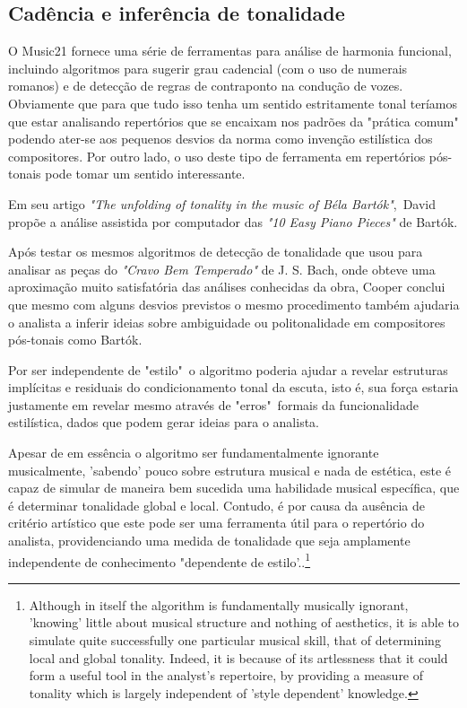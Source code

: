 \documentclass[
	12pt,				%
	openright,			%
	twoside,			%
	a4paper,			%
	english,			%
	french,				%
	spanish,			%
	brazil				%
	]{abntex2}
\begin{document}
\subsection{Cadência e inferência de tonalidade}


O Music21 fornece uma série de ferramentas para análise de harmonia funcional, incluindo algoritmos para sugerir grau cadencial (com o uso de numerais romanos) e de detecção de regras de contraponto na condução de vozes. Obviamente que para que tudo isso tenha um sentido estritamente tonal teríamos que estar analisando repertórios que se encaixam nos padrões da "prática comum"\cite[p. 354]{temperley2001cognition} podendo ater-se aos pequenos desvios da norma como invenção estilística dos compositores. Por outro lado, o uso deste tipo de ferramenta em repertórios pós-tonais pode tomar um sentido interessante. 

Em seu artigo \textit{"The unfolding of tonality in the music of Béla Bartók"},\ David  propõe a análise assistida por computador das \textit{"10 Easy Piano Pieces"} de Bartók. 

Após testar os mesmos algoritmos de detecção de tonalidade que usou para analisar as peças do \textit{"Cravo Bem Temperado"} de J. S. Bach, onde obteve uma aproximação muito satisfatória das análises conhecidas da obra, Cooper conclui que mesmo com alguns desvios previstos o mesmo procedimento também ajudaria o analista a inferir ideias sobre ambiguidade ou politonalidade em compositores pós-tonais como Bartók.

Por ser independente de "estilo"\ o algoritmo poderia ajudar a revelar estruturas implícitas e residuais do condicionamento tonal da escuta, isto é, sua força estaria justamente em revelar mesmo através de "erros"\ formais da funcionalidade estilística, dados que podem gerar ideias para o analista.

\begin{citacao}
Apesar de em essência o algoritmo ser fundamentalmente ignorante musicalmente, 'sabendo' pouco sobre estrutura musical e nada de estética, este é capaz de simular de maneira bem sucedida uma habilidade musical específica, que é determinar tonalidade global e local. Contudo, é por causa da ausência de critério artístico que este pode ser uma ferramenta útil para o repertório do analista, providenciando uma medida de tonalidade que seja amplamente independente de conhecimento "dependente de estilo'.\cite[p. 34-35]{cooper1998unfolding}.\footnote{Although in itself the algorithm is fundamentally musically ignorant, 'knowing' little about musical structure and nothing of aesthetics, it is able to simulate quite successfully one particular musical skill, that of determining local and global tonality. Indeed, it is because of its artlessness that it could form a useful tool in the analyst's repertoire, by providing a measure of tonality which is largely independent of 'style dependent' knowledge.\cite[p. 34-35]{cooper1998unfolding}}
\end{citacao}
\end{document}
